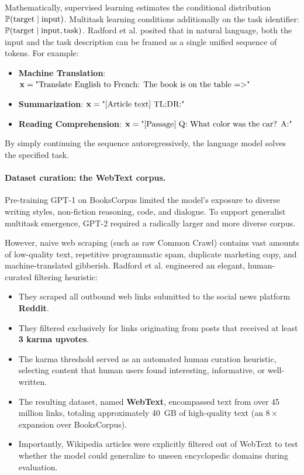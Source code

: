 \documentclass[../../main.tex]{subfiles}
\begin{document}
Mathematically, supervised learning estimates the conditional distribution $\mathbb{P}(\text{target} \mid \text{input})$. Multitask learning conditions additionally on the task identifier: $\mathbb{P}(\text{target} \mid \text{input}, \text{task})$. Radford et al. posited that in natural language, both the input and the task description can be framed as a single unified sequence of tokens. For example:
\begin{itemize}
    \item \textbf{Machine Translation}: $\mathbf{x} = \text{"Translate English to French: The book is on the table =>"}$
    \item \textbf{Summarization}: $\mathbf{x} = \text{"[Article text] TL;DR:"}$
    \item \textbf{Reading Comprehension}: $\mathbf{x} = \text{"[Passage] Q: What color was the car? A:"}$
\end{itemize}
By simply continuing the sequence autoregressively, the language model solves the specified task.

\paragraph{Dataset curation: the WebText corpus.}
Pre-training GPT-1 on BooksCorpus limited the model's exposure to diverse writing styles, non-fiction reasoning, code, and dialogue. To support generalist multitask emergence, GPT-2 required a radically larger and more diverse corpus.

However, naive web scraping (such as raw Common Crawl) contains vast amounts of low-quality text, repetitive programmatic spam, duplicate marketing copy, and machine-translated gibberish. Radford et al. engineered an elegant, human-curated filtering heuristic:
\begin{itemize}
    \item They scraped all outbound web links submitted to the social news platform \textbf{Reddit}.
    \item They filtered exclusively for links originating from posts that received at least \textbf{3 karma upvotes}.
    \item The karma threshold served as an automated human curation heuristic, selecting content that human users found interesting, informative, or well-written.
    \item The resulting dataset, named \textbf{WebText}, encompassed text from over 45 million links, totaling approximately 40~GB of high-quality text (an $8\times$ expansion over BooksCorpus).
    \item Importantly, Wikipedia articles were explicitly filtered out of WebText to test whether the model could generalize to unseen encyclopedic domains during evaluation.
\end{itemize}
\end{document}
